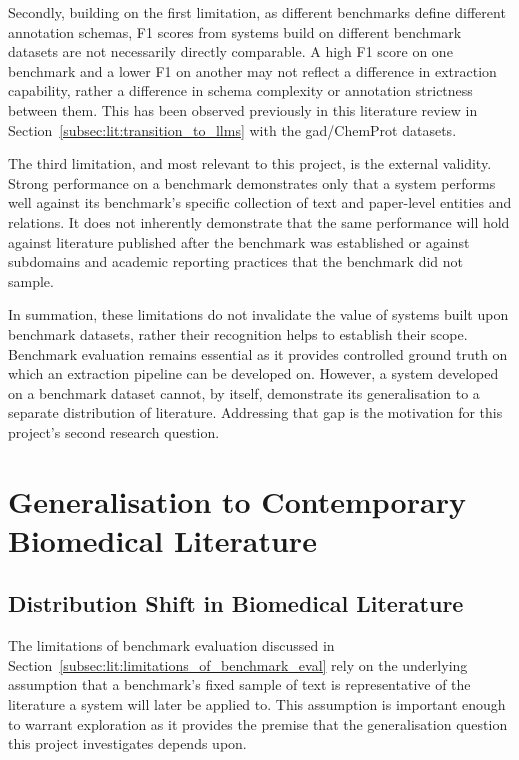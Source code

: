Secondly, building on the first limitation, as different benchmarks define different annotation schemas, F1 scores from systems build on different benchmark datasets are not necessarily directly comparable. A high F1 score on one benchmark and a lower F1 on another may not reflect a difference in extraction capability, rather a difference in schema complexity or annotation strictness between them. This has been observed previously in this literature review in Section~\ref{subsec:lit:transition_to_llms} with the \gls{gad}/ChemProt datasets.

The third limitation, and most relevant to this project, is the external validity. Strong performance on a benchmark demonstrates only that a system performs well against its benchmark's specific collection of text and paper-level entities and relations. It does not inherently demonstrate that the same performance will hold against literature published after the benchmark was established or against subdomains and academic reporting practices that the benchmark did not sample.

In summation, these limitations do not invalidate the value of systems built upon benchmark datasets, rather their recognition helps to establish their scope. Benchmark evaluation remains essential as it provides controlled ground truth on which an extraction pipeline can be developed on. However, a system developed on a benchmark dataset cannot, by itself, demonstrate its generalisation to a separate distribution of literature. Addressing that gap is the motivation for this project's second research question.

\section{Generalisation to Contemporary Biomedical Literature}
\label{sec:lit:generalisation_to_contemporary_biomed_lit}

\subsection{Distribution Shift in Biomedical Literature}
\label{subsec:lit:distribution_shift_in_biomedical_literature}
The limitations of benchmark evaluation discussed in Section~\ref{subsec:lit:limitations_of_benchmark_eval} rely on the underlying assumption that a benchmark's fixed sample of text is representative of the literature a system will later be applied to. This assumption is important enough to warrant exploration as it provides the premise that the generalisation question this project investigates depends upon.

